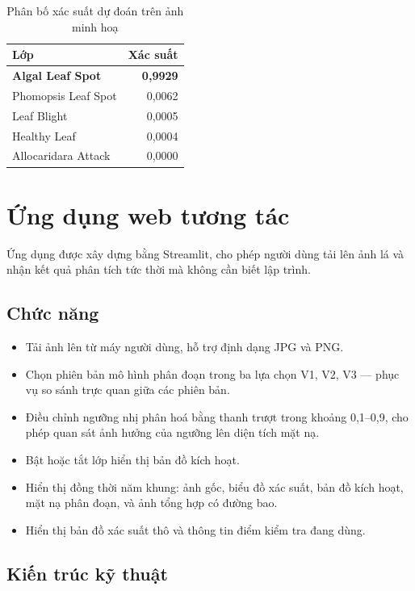 \begin{table}[H]
\centering
\caption{Phân bố xác suất dự đoán trên ảnh minh hoạ}
\label{tab:app_infer}
\begin{tabular}{l r}
\toprule
\textbf{Lớp} & \textbf{Xác suất} \\
\midrule
\textbf{Algal Leaf Spot}   & \textbf{0,9929} \\
Phomopsis Leaf Spot        & 0,0062 \\
Leaf Blight                & 0,0005 \\
Healthy Leaf               & 0,0004 \\
Allocaridara Attack        & 0,0000 \\
\bottomrule
\end{tabular}
\end{table}

\section{Ứng dụng web tương tác}

Ứng dụng được xây dựng bằng Streamlit, cho phép người dùng tải lên ảnh lá và nhận
kết quả phân tích tức thời mà không cần biết lập trình.

\subsection{Chức năng}

\begin{itemize}
    \item Tải ảnh lên từ máy người dùng, hỗ trợ định dạng JPG và PNG.
    \item Chọn phiên bản mô hình phân đoạn trong ba lựa chọn V1, V2, V3 --- phục
          vụ so sánh trực quan giữa các phiên bản.
    \item Điều chỉnh ngưỡng nhị phân hoá bằng thanh trượt trong khoảng 0,1--0,9,
          cho phép quan sát ảnh hưởng của ngưỡng lên diện tích mặt nạ.
    \item Bật hoặc tắt lớp hiển thị bản đồ kích hoạt.
    \item Hiển thị đồng thời năm khung: ảnh gốc, biểu đồ xác suất, bản đồ kích
          hoạt, mặt nạ phân đoạn, và ảnh tổng hợp có đường bao.
    \item Hiển thị bản đồ xác suất thô và thông tin điểm kiểm tra đang dùng.
\end{itemize}

\subsection{Kiến trúc kỹ thuật}

